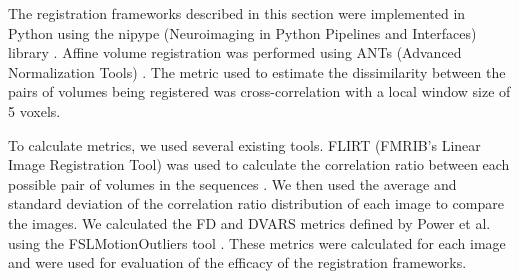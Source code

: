 The registration frameworks described in this section were implemented in Python using the nipype (Neuroimaging in Python Pipelines and Interfaces) library \cite{Gorgolewski2011}. Affine volume registration was performed using ANTs (Advanced Normalization Tools) \cite{Avants2014}. The metric used to estimate the dissimilarity between the pairs of volumes being registered was cross-correlation with a local window size of 5 voxels. 

To calculate metrics, we used several existing tools. FLIRT (FMRIB’s Linear Image Registration Tool) was used to calculate the correlation ratio between each possible pair of volumes in the sequences \cite{Jenkinson2001} \cite{Jenkinson2002}. We then used the average and standard deviation of the correlation ratio distribution of each image to compare the images. We calculated the FD and DVARS metrics defined by Power et al. using the FSLMotionOutliers tool \cite{Power2012}. These metrics were calculated for each image and were used for evaluation of the efficacy of the registration frameworks.